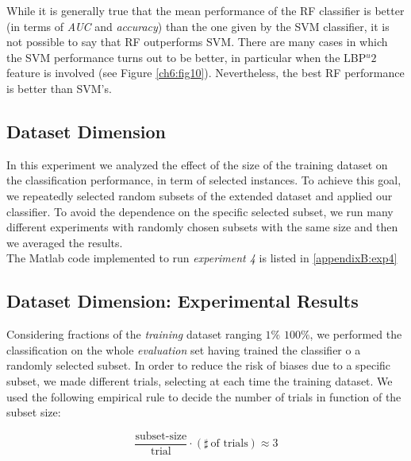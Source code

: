 While it is generally true that the mean performance of the \Gls{RF} classifier is better (in terms of \textit{AUC} and \textit{accuracy}) than the one given by the
\Gls{SVM} classifier, it is not possible to say that \Gls{RF} outperforms \Gls{SVM}. There are many cases in which the \Gls{SVM} performance turns out to be
better, in particular when the LBP$^u2$ feature is involved (see Figure \ref{ch6:fig10}). Nevertheless, the best \Gls{RF} performance is better than \Gls{SVM}'s.


\vspace{0.5cm}

\subsection{Dataset Dimension}

In this experiment we analyzed the effect of the size of the training dataset on the classification performance, in term of selected instances.
To achieve this goal, we repeatedly selected random subsets of the
extended dataset and applied our classifier. To avoid the dependence on the specific selected subset, we run many different experiments with randomly chosen subsets with the same 
size and then we averaged the results.
\\
The Matlab code implemented to run \textit{experiment 4} is listed in \ref{appendixB:exp4}

\vspace{0.5cm}



\subsection{Dataset Dimension: Experimental Results}

Considering fractions of the \textit{training} dataset ranging $1\%$ \textrightarrow $100\%$, we performed the classification on the
whole \textit{evaluation} set having trained the classifier o a randomly selected subset. In order to reduce the risk of biases due to
a specific subset, we made different trials, selecting at each time the training dataset. We used the following empirical rule to decide 
the number of trials in function of the subset size:

\begin{equation}
\label{ch6:eq1}
 \frac{\textrm{subset-size}}{\textrm{trial}} \cdot \left( \sharp \ \textrm{of trials} \right) \approx 3
\end{equation}

